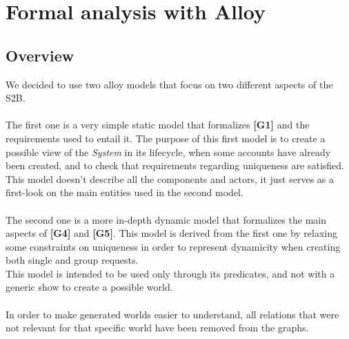 \documentclass[titlepage]{article}
\begin{document}
	\section{Formal analysis with Alloy}
		
		\subsection{Overview}
		We decided to use two alloy models that focus on two different aspects of the S2B.\\
		\\
		The first one is a very simple static model that formalizes {\bf [G1]} and the requirements used to entail it. The 			purpose of this first model is to create a possible view of the {\it System} in its lifecycle, when some accounts have 			already been created, and to check that requirements regarding uniqueness are satisfied. \\
		This model doesn’t describe all the components and actors, it just serves as a first-look on the main entities used in 		the second model.\\
		\\
		The second one is a more in-depth dynamic model that formalizes the main aspects of {\bf [G4]} and {\bf [G5]}. This 		model is derived from the first one by relaxing some constraints on uniqueness in order to represent dynamicity 		when creating both single and group requests.\\
		This model is intended to be used only through its predicates, and not with a generic show to create a possible 		world.\\
		\\
		In order to make generated worlds easier to understand, all relations that were not relevant for that specific world 		have been removed from the graphs.\\
		
\end{document}
